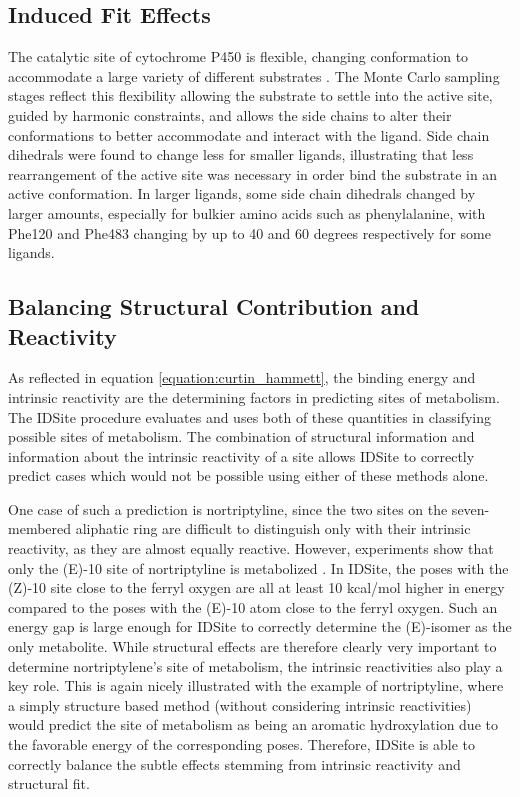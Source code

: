 \subsection{Induced Fit Effects}
\label{subsection:p450/discussion/induced_fit}
The catalytic site of cytochrome P450 is flexible, changing conformation to accommodate a large variety of different substrates \cite{li2004structural,scott2004structure}.
The Monte Carlo sampling stages reflect this flexibility allowing the substrate to settle into the active site, guided by harmonic constraints, and allows the side chains to alter their conformations to better accommodate and interact with the ligand.
Side chain dihedrals were found to change less for smaller ligands, illustrating that less rearrangement of the active site was necessary in order bind the substrate in an active conformation.
In larger ligands, some side chain dihedrals changed by larger amounts, especially for bulkier amino acids such as phenylalanine, with Phe120 and Phe483 changing by up to 40 and 60 degrees respectively for some ligands.

\subsection{Balancing Structural Contribution and Reactivity}
\label{subsection:p450/discussion/structure_effects}
As reflected in equation \ref{equation:curtin_hammett}, the binding energy and intrinsic reactivity are the determining factors in predicting sites of metabolism.
The IDSite procedure evaluates and uses both of these quantities in classifying possible sites of metabolism.
The combination of structural information and information about the intrinsic reactivity of a site allows IDSite to correctly predict cases which would not be possible using either of these methods alone.

One case of such a prediction is nortriptyline, since the two sites on the seven-membered aliphatic ring are difficult to distinguish only with their intrinsic reactivity, as they are almost equally reactive.
However, experiments show that only the (E)-10 site of nortriptyline is metabolized \cite{linnet1997metabolism}.
In IDSite, the poses with the (Z)-10 site close to the ferryl oxygen are all at least 10 kcal/mol higher in energy compared to the poses with the (E)-10 atom close to the ferryl oxygen. 
Such an energy gap is large enough for IDSite to correctly determine the (E)-isomer as the only metabolite. 
While structural effects are therefore clearly very important to determine nortriptylene's site of metabolism, the intrinsic reactivities also play a key role. 
This is again nicely illustrated with the example of nortriptyline, where a simply structure based method (without considering intrinsic reactivities) would predict the site of metabolism as being an aromatic hydroxylation due to the favorable energy of the corresponding poses.
Therefore, IDSite is able to correctly balance the subtle effects stemming from intrinsic reactivity and structural fit.

